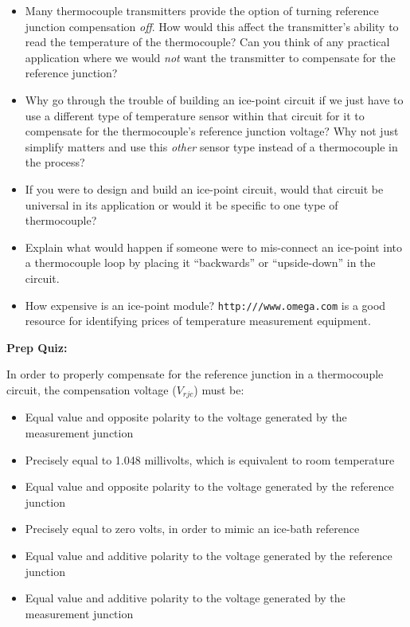\begin{itemize}
\item{} Many thermocouple transmitters provide the option of turning reference junction compensation {\it off}.  How would this affect the transmitter's ability to read the temperature of the thermocouple?  Can you think of any practical application where we would {\it not} want the transmitter to compensate for the reference junction?
\item{} Why go through the trouble of building an ice-point circuit if we just have to use a different type of temperature sensor within that circuit for it to compensate for the thermocouple's reference junction voltage?  Why not just simplify matters and use this {\it other} sensor type instead of a thermocouple in the process?
\item{} If you were to design and build an ice-point circuit, would that circuit be universal in its application or would it be specific to one type of thermocouple?
\item{} Explain what would happen if someone were to mis-connect an ice-point into a thermocouple loop by placing it ``backwards'' or ``upside-down'' in the circuit.
\item{} How expensive is an ice-point module?  {\tt http:///www.omega.com} is a good resource for identifying prices of temperature measurement equipment.
\end{itemize}











\vfil \eject

\noindent
{\bf Prep Quiz:}

In order to properly compensate for the reference junction in a thermocouple circuit, the compensation voltage ($V_{rjc}$) must be:

\begin{itemize}
\item{} Equal value and opposite polarity to the voltage generated by the measurement junction 
\vskip 5pt 
\item{} Precisely equal to 1.048 millivolts, which is equivalent to room temperature
\vskip 5pt 
\item{} Equal value and opposite polarity to the voltage generated by the reference junction
\vskip 5pt 
\item{} Precisely equal to zero volts, in order to mimic an ice-bath reference
\vskip 5pt 
\item{} Equal value and additive polarity to the voltage generated by the reference junction
\vskip 5pt 
\item{} Equal value and additive polarity to the voltage generated by the measurement junction 
\end{itemize}




